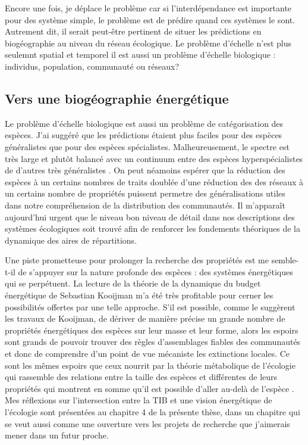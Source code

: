 Encore une fois, je déplace le problème car si l'interdépendance est
importante pour des système simple, le problème est de prédire quand ces
systèmes le sont. Autrement dit, il serait peut-être pertinent de situer
les prédictions en biogéographie au niveau du réseau écologique. Le
problème d'échelle n'est plus seulemnt spatial et temporel il est aussi
un problème d'échelle biologique : individus, population, communauté ou
réseaux?

\subsection*{Vers une biogéographie
énergétique}\label{vers-une-bioguxe9ographie-uxe9nerguxe9tique}

Le problème d'échelle biologique est aussi un problème de catégorisation
des espèces. J'ai suggéré que les prédictions étaient plus faciles pour
des espèces généralistes que pour des espèces spécialistes.
Malheureusement, le spectre est très large et plutôt balancé avec un
continuum entre des espèces hyperspécialistes de d'autres très
généralistes \citep{Poisot2015c}. On peut néamoins espérer que la
réduction des espèces à un certains nombres de traits
\citep{McGill2006, Poisot2015} doublée d'une réduction des des réseaux à
un certains nombre de propriétés puissent permetre des généralisations
utiles dans notre compréhension de la distribution des communautés. Il
m'apparaît aujourd'hui urgent que le niveau bon niveau de détail dans
nos descriptions des systèmes écologiques soit trouvé afin de renforcer
les fondements théoriques de la dynamique des aires de répartitions.

Une piste prometteuse pour prolonger la recherche des propriétés est me
semble-t-il de s'appuyer sur la nature profonde des espèces : des
systèmes énergétiques qui se perpétuent. La lecture de la théorie de la
dynamique du budget énergétique de Sebastian Kooijman
\citep{Kooijman2000a} m'a été très profitable pour cerner les
possibilités offertes par une telle approche. S'il est possible, comme
le suggèrent les travaux de Kooijman, de dériver de manière précise un
grande nombre de propriétés énergétiques des espèces sur leur masse et
leur forme, alors les espoirs sont grands de pouvoir trouver des règles
d'assemblages fiables des communautés et donc de comprendre d'un point
de vue mécaniste les extinctions locales. Ce sont les mêmes espoirs que
ceux nourrit par la théorie métabolique de l'écologie qui rassemble des
relations entre la taille des espèces et différentes de leurs propriétés
\citep{Brown2004} qui montrent en somme qu'il est possible d'aller
au-delà de l'espèce \citep{Poisot2015}. Mes réflexions sur
l'intersection entre la TIB et une vision énergétique de l'écologie sont
présentées au chapitre 4 de la présente thèse, dans un chapitre qui se
veut aussi comme une ouverture vers les projets de recherche que
j'aimerais mener dans un futur proche.
